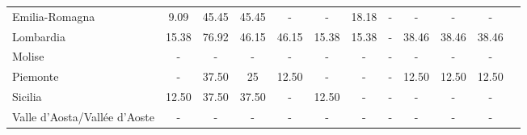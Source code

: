 \begin{table}[H]
\begin{tabularx}{\textwidth}{Xccccccccccc}
            Emilia-Romagna & 9.09 & 45.45 & 45.45 & - & - & 18.18 & - & - & - & - \\
            Lombardia & 15.38 & 76.92 & 46.15 & 46.15 & 15.38 & 15.38 & - & 38.46 & 38.46 & 38.46 \\
            Molise & - & - & - & - & - & - & - & - & - & - \\
            Piemonte & - & 37.50 & 25 & 12.50 & - & - & - & 12.50 & 12.50 & 12.50 \\
            Sicilia & 12.50 & 37.50 & 37.50 & - & 12.50 & - & - & - & - & - \\
            Valle d’Aosta/Vallée d’Aoste & - & - & - & - & - & - & - & - & - & - \\
        \bottomrule
    \end{tabularx}
\end{table}
    